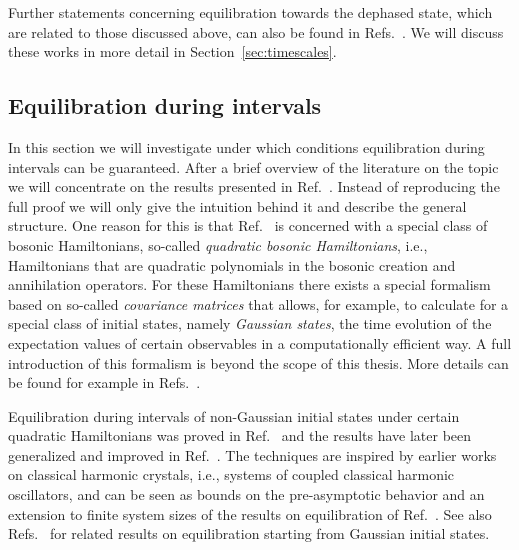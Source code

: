 \documentclass[a4paper,12pt,listof=totoc,index=totoc,bibliography=totoc,headsepline=false,headings=normal,BCOR16.153846mm,DIV12,headinclude,twoside,cleardoublepage=empty,numbers=noenddot,final]{scrreprt}
\theoremstyle{mystyle}
\numberwithin{equation}{section}
\numberwithin{figure}{section}
\numberwithin{lemma}{section}
\numberwithin{theorem}{section}
\numberwithin{corollary}{section}
\numberwithin{definition}{section}
\numberwithin{conjecture}{section}
\numberwithin{observation}{section}
\newcommand{\+}{\mkern2mu}
\DeclareMathOperator{\1}{\mathds{1}}
\begin{document}
Further statements concerning equilibration towards the dephased state, which are related to those discussed above, can also be found in Refs.~\cite{1108.2985v3,1108.0374,1112.5295v1,1107.6035v1}.
We will discuss these works in more detail in Section~\ref{sec:timescales}.


\subsection{Equilibration during intervals}
\label{sec:equlibrationinthestrongsense}
%
In this section we will investigate under which conditions equilibration during intervals can be guaranteed.
After a brief overview of the literature on the topic we will concentrate on the results presented in Ref.~\cite{cramer10_1}.
Instead of reproducing the full proof we will only give the intuition behind it and describe the general structure.
One reason for this is that Ref.~\cite{cramer10_1} is concerned with a special class of bosonic Hamiltonians, so-called \emph{quadratic bosonic Hamiltonians}, i.e., Hamiltonians that are quadratic polynomials in the bosonic creation and annihilation operators.
For these Hamiltonians there exists a special formalism based on so-called \emph{covariance matrices} that allows, for example, to calculate for a special class of initial states, namely \emph{Gaussian states}, the time evolution of the expectation values of certain observables in a computationally efficient way.
A full introduction of this formalism is beyond the scope of this thesis.
More details can be found for example in Refs.~\cite{Anders2003,Braunstein2005,Adesso2007}.

Equilibration during intervals of non-Gaussian initial states under certain quadratic Hamiltonians was proved in Ref.~\cite{PhysRevLett.10-5} and the results have later been generalized and improved in Ref.~\cite{cramer10_1}.
The techniques are inspired by earlier works \cite{Dudnikova2003} on classical harmonic crystals, i.e., systems of coupled classical harmonic oscillators, and can be seen as bounds on the pre-asymptotic behavior and an extension to finite system sizes of the results on equilibration of Ref.~\cite{Lanford1972}.
See also Refs.~\cite{Lanford1972,Tegmark1994,Barthel08} for related results on equilibration starting from Gaussian initial states.
\end{document}
